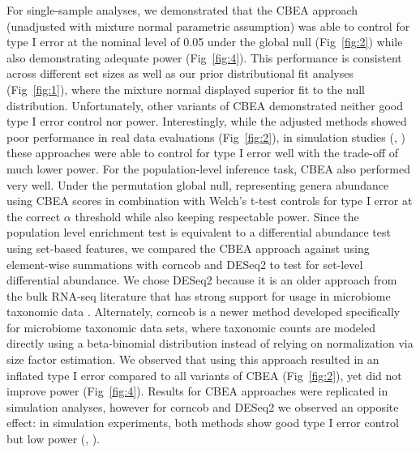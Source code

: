 For single-sample analyses, we demonstrated that the CBEA approach (unadjusted with mixture normal parametric assumption) was able to control for type I error at the nominal level of 0.05 under the global null (Fig~\ref{fig:2}) while also demonstrating adequate power (Fig~\ref{fig:4}). This performance is consistent across different set sizes as well as our prior distributional fit analyses (Fig~\ref{fig:1}), where the mixture normal displayed superior fit to the null distribution. Unfortunately, other variants of CBEA demonstrated neither good type I error control nor power. Interestingly, while the adjusted methods showed poor performance in real data evaluations (Fig~\ref{fig:2}), in simulation studies (, ) these approaches were able to control for type I error well with the trade-off of much lower power. 
For the population-level inference task, CBEA also performed very well. Under the permutation global null, representing genera abundance using CBEA scores in combination with Welch's t-test controls for type I error at the correct $\alpha$ threshold while also keeping respectable power. Since the population level enrichment test is equivalent to a differential abundance test using set-based features, we compared the CBEA approach against using element-wise summations with corncob \cite{martin2020} and DESeq2 \cite{love2014} to test for set-level differential abundance. We chose DESeq2 because it is an older approach from the bulk RNA-seq literature that has strong support for usage in microbiome taxonomic data \cite{mcmurdie2014}. Alternately, corncob is a newer method developed specifically for microbiome taxonomic data sets, where taxonomic counts are modeled directly using a beta-binomial distribution instead of relying on normalization via size factor estimation. We observed that using this approach resulted in an inflated type I error compared to all variants of CBEA (Fig~\ref{fig:2}), yet did not improve power (Fig~\ref{fig:4}). Results for CBEA approaches were replicated in simulation analyses, however for corncob and DESeq2 we observed an opposite effect: in simulation experiments, both methods show good type I error control but low power (, ).  

